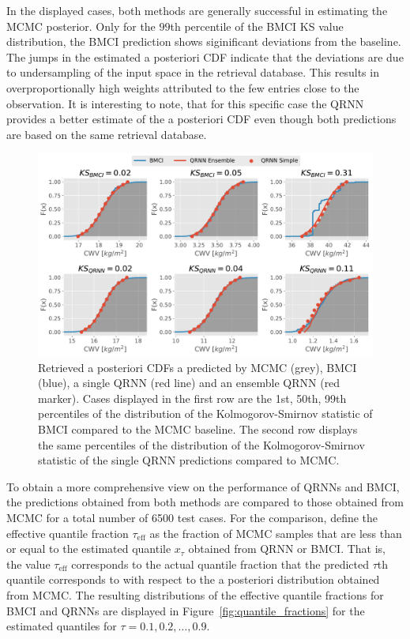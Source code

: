 \documentclass[journal abbreviation, manuscript]{copernicus}
\begin{document}
  In the displayed cases, both methods are generally successful in estimating the
  MCMC posterior. Only for the $99$th percentile of the BMCI KS value distribution,
  the BMCI prediction shows siginificant deviations from the baseline. The jumps
  in the estimated a posteriori CDF  indicate that the deviations are due to
  undersampling of the input space in the retrieval database. This results in 
  overproportionally high weights attributed to the few entries close to the
  observation. It is interesting to note, that for this specific case the QRNN
  provides a better estimate of the a posteriori CDF even though both
  predictions are based on the same retrieval database.

  \begin{figure}[hbpt!]
    \centering
    \includegraphics[width = 0.8\linewidth]{../plots/posterior_cdfs}
    \caption{Retrieved a posteriori CDFs a predicted by MCMC (grey), BMCI (blue),
      a single QRNN (red line) and an ensemble QRNN (red marker). Cases displayed in the first
      row are the 1st, 50th, 99th percentiles of the distribution of the Kolmogorov-Smirnov
      statistic of BMCI compared to the MCMC baseline. The second row displays the
      same percentiles of the distribution of the Kolmogorov-Smirnov statistic of the
      single QRNN predictions compared to MCMC.}
    \label{fig:cdfs}
  \end{figure}

  To obtain a more comprehensive view on the performance of QRNNs and BMCI, the
  predictions obtained from both methods are compared to those obtained from
  MCMC for a total number of 6500 test cases. For the comparison, define the
  effective quantile fraction $\tau_{\text{eff}}$ as the fraction of MCMC
  samples that are less than or equal to the estimated quantile $x_\tau$
  obtained from QRNN or BMCI. That is, the value $\tau_\text{eff}$ corresponds
  to the actual quantile fraction that the predicted $\tau$th quantile
  corresponds to with respect to the a posteriori distribution obtained from
  MCMC. The resulting distributions of the effective quantile fractions for BMCI
  and QRNNs are displayed in Figure~\ref{fig:quantile_fractions} for the
  estimated quantiles for $\tau = 0.1, 0.2, \ldots, 0.9$.
\end{document}
